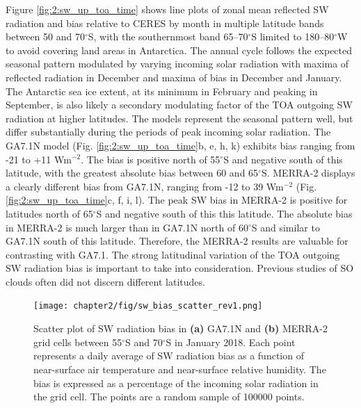Figure \ref{fig:2:sw_up_toa_time} shows line plots of zonal mean reflected SW
radiation and bias relative to CERES by month in multiple latitude bands
between 50 and 70$^\circ$S, with the southernmost band 65--70$^\circ$S limited
to 180--80$^\circ$W to avoid covering land areas in Antarctica. The annual
cycle follows the expected seasonal pattern modulated by varying incoming solar
radiation with maxima of reflected radiation in December and maxima of bias in
December and January. The Antarctic sea ice extent, at its minimum in February
and peaking in September, is also likely a secondary modulating factor of the
TOA outgoing SW radiation at higher latitudes. The models represent the
seasonal pattern well, but differ substantially during the periods of peak
incoming solar radiation. The GA7.1N model (Fig. \ref{fig:2:sw_up_toa_time}b, e,
h, k) exhibits bias ranging from -21 to +11 Wm$^{-2}$. The bias is positive
north of 55$^\circ$S and negative south of this latitude, with the greatest
absolute bias between 60 and 65$^\circ$S. MERRA-2 displays a clearly different
bias from GA7.1N, ranging from -12 to 39 Wm$^{-2}$ (Fig.
\ref{fig:2:sw_up_toa_time}c, f, i, l). The peak SW bias in MERRA-2 is positive for
latitudes north of 65$^\circ$S and negative south of this this latitude. The
absolute bias in MERRA-2 is much larger than in GA7.1N north of 60$^\circ$S and
similar to GA7.1N south of this latitude. Therefore, the MERRA-2 results are
valuable for contrasting with GA7.1. The strong latitudinal variation of the
TOA outgoing SW radiation bias is important to take into consideration.
Previous studies of SO clouds often did not discern different latitudes.

\begin{figure}[t]
\centering
\texttt{[image: chapter2/fig/sw\_bias\_scatter\_rev1.png]}
\caption[Scatter plot of SW radiation bias in GA7.1N and MERRA-2]{
Scatter plot of SW radiation bias in \textbf{(a)} GA7.1N and \textbf{(b)} MERRA-2 grid cells
between 55$^\circ$S and 70$^\circ$S in January 2018. Each point represents a
daily average of SW radiation bias as a function of near-surface air temperature
and near-surface relative humidity. The bias is expressed as a percentage of the
incoming solar radiation in the grid cell. The points are a random sample of
100000 points.
}
\label{fig:2:sw-bias-scatter}
\end{figure}

